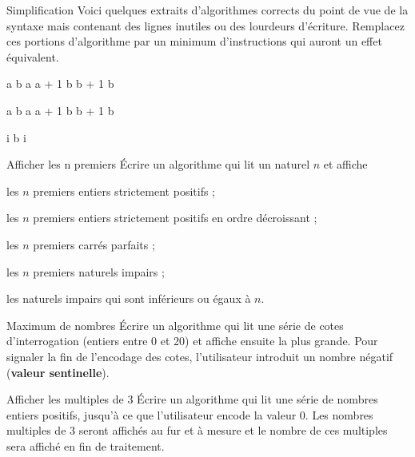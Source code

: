 \begin{Exercice}{Simplification}
	Voici quelques extraits d’algorithmes corrects du point de vue de la
	syntaxe mais contenant des lignes inutiles ou des lourdeurs d’écriture.
	Remplacez ces portions d’algorithme par un minimum d’instructions qui
	auront un effet équivalent.

	\begin{Pseudocode}
	\Let a 
	\Let b 
		\Let a \Gets a + 1
		\Let b \Gets b + 1
		\Write b
	\EndWhile
	\end{Pseudocode}

	\begin{Pseudocode}
	\Let a \Gets 1
	\Let b \Gets 1
	\While{a < 10}
		\Let a \Gets a + 1
		\Let b \Gets b + 1
	\EndWhile
	\Write b
	\end{Pseudocode}

	\begin{Pseudocode}
	\Let i 
	\For{i \K{de} 1 \K{à} 10}
		\Let b \Gets i
	\EndFor
	\end{Pseudocode}
\end{Exercice}

\begin{Exercice}{Afficher les n premiers}
	Écrire un algorithme qui lit un naturel $n$ et affiche
	
	\begin{liste}
	\item {
	les $n$ premiers entiers strictement positifs ;}
	\item {
	les $n$ premiers entiers strictement positifs en ordre décroissant ;}
	\item {
	les $n$ premiers carrés parfaits ;}
	\item {
	les $n$ premiers naturels impairs ;}
	\item {
	les naturels impairs qui sont inférieurs ou égaux à $n$.}
	\end{liste}
\end{Exercice}

\begin{Exercice}{Maximum de nombres}
	Écrire un algorithme qui lit une série de cotes d’interrogation (entiers
	entre 0 et 20) et affiche ensuite la plus grande. Pour signaler la fin
	de l’encodage des cotes, l’utilisateur introduit un nombre négatif
	(\textbf{valeur sentinelle}).
\end{Exercice}

\begin{Exercice}{Afficher les multiples de 3}
	Écrire un algorithme qui lit une série de nombres entiers positifs,
	jusqu’à ce que l’utilisateur encode la valeur 0. Les nombres multiples
	de 3 seront affichés au fur et à mesure et le nombre de ces multiples
	sera affiché en fin de traitement.
\end{Exercice}


